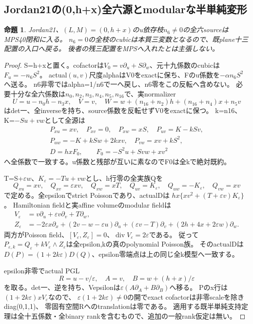 \documentclass[a4paper,11pt]{ltjsarticle}
\newtheorem{proposition}{命題}[section]
\theoremstyle{definition}
\begin{document}
\subsection{Jordan21の(0,h+x)全六源とmodularな半単純変形}
\begin{proposition}\label{prop:two-hyperplanes-j21-zero-hx-all-MPS}
Jordan21、$(L,M)=(0,h+x)$のu依存枝$n_6\ne0$の全六sourceはMPS40閉和に入る。
$n_6=0$の全枝のcubicは本質三変数となるので、既plane十三配置の入口へ戻る。
後者の残三配置をMPSへ入れたとは主張しない。
\end{proposition}
\begin{proof}
S=h+xと置く。cofactorは$V_0=v\partial_u+S\partial_w$、元十九係数のcubicは$F_u=-n_6S^2$。
actual$(u,v)$尺度alphaはV0をexactに保ち、Fのu係数を$-\alpha n_6S^2$へ送る。
n6非零ではalpha=1/n6で一へ戻し、n6零をこの反転へ含めない。
必要十分な全六係数は$n_0,n_2,n_3,n_4,n_5,n_{16}$で、実normalizer
\[
 U=u-n_0h-n_3x,\quad V=v,\quad
 W=w+(n_{16}+n_2)h+(n_{16}+n_4)x+n_5v
\]
はdet一、全inverseを持ち、source係数を反転せずV0をexactに保つ。
k=n16、K=$-Su+vw$として全源は
\[
\begin{gathered}
 P_{xu}=xv,\quad P_{xv}=0,\quad P_{xw}=xS,\quad
 P_{uv}=K-kSv,\\
 P_{uw}=-K+kSw+2kxv,\quad P_{vw}=xv+kS^2,\\
 D=hxF_0,\qquad F_0=-S^2u+Svw+xv^2
\end{gathered}
\]
へ全係数で一致する。u係数と残部が互いに素なのでF0は全kで絶対既約。

T=S+$\varepsilon w$、$K_\varepsilon=-Tu+vw$とし、h行零の全実族Qを
\[
 Q_{xu}=xv,\quad Q_{xv}=\varepsilon xv,\quad Q_{xw}=xT,\quad
 Q_{uv}=K_\varepsilon,\quad Q_{uw}=-K_\varepsilon,\quad Q_{vw}=xv
\]
で定める。全epsilonでstrict Poissonであり、actualDは
$hx\{xv^2+(T+\varepsilon v)K_\varepsilon\}$。
Hamiltonian fieldと実affine volumeのmodular fieldは
\[
\begin{split}
 V_\varepsilon&=v\partial_u+\varepsilon v\partial_v+T\partial_w,\\
 Z_\varepsilon&=-2\varepsilon x\partial_x+(2v-w-\varepsilon u)\partial_u
 +(\varepsilon v-T)\partial_v+(2h+4x+2\varepsilon w)\partial_w.
\end{split}
\]
両方がPoisson field、$[V_\varepsilon,Z_\varepsilon]=0$、$\operatorname{div}V_\varepsilon=2\varepsilon$である。
従って$P_{\varepsilon,k}=Q_\varepsilon+kV_\varepsilon\wedge Z_\varepsilon$は全epsilon,kの真のpolynomial Poisson族。
そのactualDは$D(P)=(1+2k\varepsilon)D(Q)$、epsilon零端点は上の同じ全k模型へ一致する。

epsilon非零でactual PGL
\[
 R=u-v/\varepsilon,\quad A=v,\quad B=w+(h+x)/\varepsilon
\]
を取る。det一、逆を持ち、Vepsilonは$\varepsilon(A\partial_A+B\partial_B)$へ移る。
Pのx行は$(1+2k\varepsilon)xV_\varepsilon$なので、
$\varepsilon(1+2k\varepsilon)\ne0$の開でexact cofactorは非零scaleを除きdiag(0,1,1)、
零固有空間Rへのtranslationは零である。
適用する既半単純支持定理は全十五係数・全binary rankを含むもので、追加の一般rank仮定は無い。


\end{proof}
\end{document}
